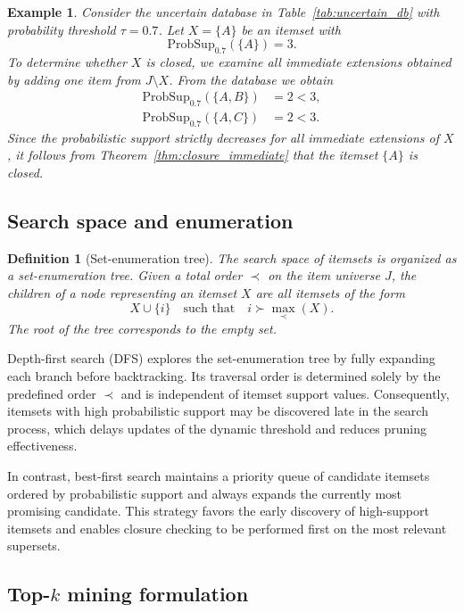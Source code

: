 \documentclass[10pt,letterpaper]{article}
\newtheorem{definition}{Definition}[section]
\newtheorem{example}{Example}[section]
\newcounter{definition}
\newcounter{example}
\begin{document}
\begin{example}
\label{ex:closedA}
Consider the uncertain database in Table~\ref{tab:uncertain_db} with probability threshold $\tau = 0.7$. Let $X=\{A\}$ be an itemset with
\[
\mathrm{ProbSup}_{0.7}(\{A\}) = 3.
\]
To determine whether $X$ is closed, we examine all immediate extensions obtained by adding one item from $J \setminus X$. From the database we obtain
\begin{align*}
\mathrm{ProbSup}_{0.7}(\{A,B\}) &= 2 < 3, \\
\mathrm{ProbSup}_{0.7}(\{A,C\}) &= 2 < 3.
\end{align*}
Since the probabilistic support strictly decreases for all immediate extensions of $X$, it follows from Theorem~\ref{thm:closure_immediate} that the itemset $\{A\}$ is closed.
\end{example}

\subsection*{Search space and enumeration}
\label{subsec:search_space}

\begin{definition}[Set-enumeration tree]
\label{def:set_enum_tree}
The search space of itemsets is organized as a set-enumeration tree.  
Given a total order $\prec$ on the item universe $J$, the children of a node representing an itemset $X$ are all itemsets of the form
\[
X \cup \{i\} \quad \text{such that} \quad i \succ \max_{\prec}(X).
\]
The root of the tree corresponds to the empty set.
\end{definition}

Depth-first search (DFS) explores the set-enumeration tree by fully expanding each branch before backtracking. Its traversal order is determined solely by the predefined order $\prec$ and is independent of itemset support values. Consequently, itemsets with high probabilistic support may be discovered late in the search process, which delays updates of the dynamic threshold and reduces pruning effectiveness.

In contrast, best-first search maintains a priority queue of candidate itemsets ordered by probabilistic support and always expands the currently most promising candidate. This strategy favors the early discovery of high-support itemsets and enables closure checking to be performed first on the most relevant supersets.

\subsection*{Top-$k$ mining formulation}
\label{subsec:topk_formulation}
\end{document}
